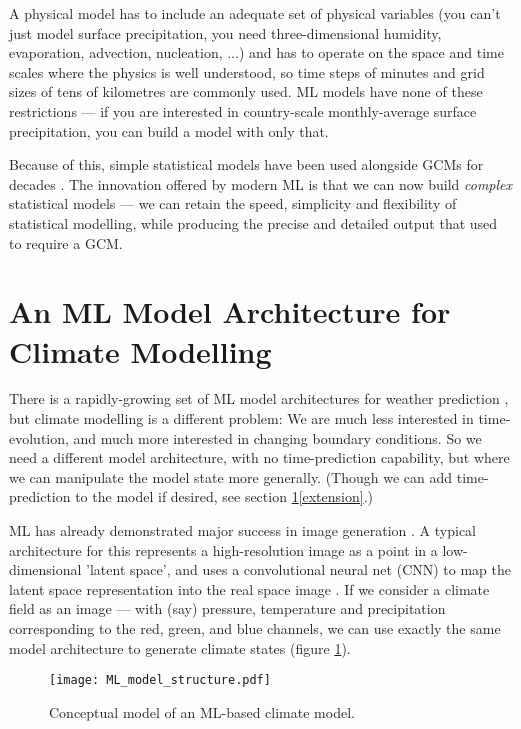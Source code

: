 \documentclass{ametsocV6.1}
\begin{document}
A physical model has to include an adequate set of physical variables (you can't just model surface precipitation, you need three-dimensional humidity, evaporation, advection, nucleation, ...) and has to operate on the space and time scales where the physics is well understood, so time steps of minutes and grid sizes of tens of kilometres are commonly used. ML models have none of these restrictions --- if you are interested in country-scale monthly-average surface precipitation, you can build a model with only that.

Because of this, simple statistical models have been used alongside GCMs for decades \citep{MAGICC}. The innovation offered by modern ML is that we can now build {\it complex} statistical models --- we can retain the speed, simplicity and flexibility of statistical modelling, while producing the precise and detailed output that used to require a GCM.

\section{An ML Model Architecture for Climate Modelling}
\label{Architecture}

There is a rapidly-growing set of ML model architectures for weather prediction \citep{keisler2022forecasting,bi2022panguweather,nguyen2023climax}, but climate modelling is a different problem: We are much less interested in time-evolution, and much more interested in changing boundary conditions. So we need a different model architecture, with no time-prediction capability, but where we can manipulate the model state more generally. (Though we can add time-prediction to the model if desired, see section \ref{Architecture}\ref{extension}.)

ML has already demonstrated major success in image generation \citep{StyleGAN2,Stable_Diffusion}. A typical architecture for this represents a high-resolution image as a point in a low-dimensional 'latent space', and uses a convolutional neural net (CNN) to map the latent space representation into the real space image \citep{StyleGAN}. If we consider a climate field as an image --- with (say) pressure, temperature and precipitation corresponding to the red, green, and blue channels, we can use exactly the same model architecture to generate climate states (figure \ref{ML_model_structure}).

\begin{figure}[h]
\texttt{[image: ML\_model\_structure.pdf]}
\caption{Conceptual model of an ML-based climate model.}
\label{ML_model_structure}
\end{figure}
\end{document}
